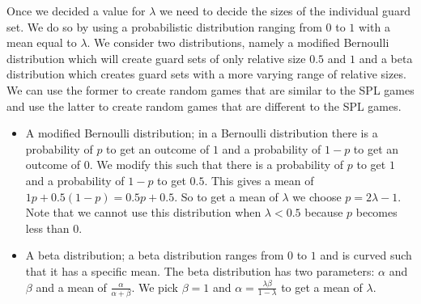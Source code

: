 Once we decided a value for $\lambda$ we need to decide the sizes of the individual guard set. We do so by using a probabilistic distribution ranging from $0$ to $1$ with a mean equal to $\lambda$. We consider two distributions, namely a modified Bernoulli distribution which will create guard sets of only relative size $0.5$ and $1$ and a beta distribution which creates guard sets with a more varying range of relative sizes. We can use the former to create random games that are similar to the SPL games and use the latter to create random games that are different to the SPL games.
\begin{itemize}
	\item A modified Bernoulli distribution; in a Bernoulli distribution there is a probability of $p$ to get an outcome of $1$ and a probability of $1-p$ to get an outcome of $0$. We modify this such that there is a probability of $p$ to get $1$ and a probability of $1-p$ to get $0.5$. This gives a mean of $1p + 0.5(1-p) = 0.5p + 0.5$. So to get a mean of $\lambda$ we choose $p = 2\lambda - 1$. Note that we cannot use this distribution when $\lambda < 0.5$ because $p$ becomes less than $0$.
	\item A beta distribution; a beta distribution ranges from $0$ to $1$ and is curved such that it has a specific mean. The beta distribution has two parameters: $\alpha$ and $\beta$ and a mean of $\frac{\alpha}{\alpha+\beta}$. We pick $\beta=1$ and $\alpha = \frac{\lambda\beta}{1-\lambda}$ to get a mean of $\lambda$.
\end{itemize}

